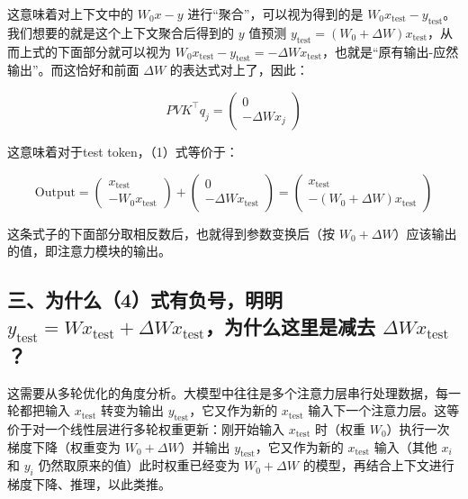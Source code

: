 这意味着对上下文中的 \(W_0x-y\) 进行``聚合''，可以视为得到的是 \(W_0x_{\mathrm{test}}-y_{\mathrm{test}}\)。我们想要的就是这个上下文聚合后得到的 \(y\) 值预测 \(y_{\mathrm{test}}=(W_0+\Delta W)x_{\mathrm{test}}\)，从而上式的下面部分就可以视为 \(W_0x_{\mathrm{test}}-y_{\mathrm{test}}=-\Delta W x_{\mathrm{test}}\)，也就是``原有输出-应然输出''。而这恰好和前面 \(\Delta W\) 的表达式对上了，因此：

\[
PVK^\top q_j=\begin{pmatrix}0\\-\Delta W x_j\end{pmatrix}
\]

这意味着对于test token，（1）式等价于：

\[
\mathrm{Output}
=\begin{pmatrix}x_{\mathrm{test}}\\-W_0x_{\mathrm{test}}\end{pmatrix}
+\begin{pmatrix}0\\-\Delta W x_{\mathrm{test}}\end{pmatrix}
=\begin{pmatrix}x_{\mathrm{test}}\\-(W_0+\Delta W)x_{\mathrm{test}}\end{pmatrix}
\tag{4}
\]

这条式子的下面部分取相反数后，也就得到参数变换后（按 \(W_0+\Delta W\)）应该输出的值，即注意力模块的输出。

\hypertarget{ux4e09ux4e3aux4ec0ux4e484ux5f0fux6709ux8d1fux53f7ux660eux660e-y_mathrmtestwx_mathrmtestdelta-wx_mathrmtestux4e3aux4ec0ux4e48ux8fd9ux91ccux662fux51cfux53bb-delta-wx_mathrmtest}{%
\subsection{\texorpdfstring{三、为什么（4）式有负号，明明 \(y_{\mathrm{test}}=Wx_{\mathrm{test}}+\Delta Wx_{\mathrm{test}}\)，为什么这里是减去 \(\Delta Wx_{\mathrm{test}}\)？}{三、为什么（4）式有负号，明明 y\_\{\textbackslash mathrm\{test\}\}=Wx\_\{\textbackslash mathrm\{test\}\}+\textbackslash Delta Wx\_\{\textbackslash mathrm\{test\}\}，为什么这里是减去 \textbackslash Delta Wx\_\{\textbackslash mathrm\{test\}\}？}}\label{ux4e09ux4e3aux4ec0ux4e484ux5f0fux6709ux8d1fux53f7ux660eux660e-y_mathrmtestwx_mathrmtestdelta-wx_mathrmtestux4e3aux4ec0ux4e48ux8fd9ux91ccux662fux51cfux53bb-delta-wx_mathrmtest}}

这需要从多轮优化的角度分析。大模型中往往是多个注意力层串行处理数据，每一轮都把输入 \(x_{\mathrm{test}}\) 转变为输出 \(y_{\mathrm{test}}\)，它又作为新的 \(x_{\mathrm{test}}\) 输入下一个注意力层。这等价于对一个线性层进行多轮权重更新：刚开始输入 \(x_{\mathrm{test}}\) 时（权重 \(W_0\)）执行一次梯度下降（权重变为 \(W_0+\Delta W\)）并输出 \(y_{\mathrm{test}}\)，它又作为新的 \(x_{\mathrm{test}}\) 输入（其他 \(x_i\) 和 \(y_i\) 仍然取原来的值）此时权重已经变为 \(W_0+\Delta W\) 的模型，再结合上下文进行梯度下降、推理，以此类推。

